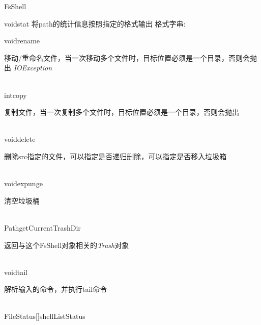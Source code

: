 \begin{XeClass}{FsShell}
\begin{XeMethod}{}{void}{stat}
 将path的统计信息按照指定的格式输出
 格式字串:

  \end{XeMethod}

  \begin{XeMethod}{}{void}{rename}
       
 移动/重命名文件，当一次移动多个文件时，目标位置必须是一个目录，否则会抛出
 \emph{IOException}

  \end{XeMethod}

  \begin{XeMethod}{\XePrivate\\ }{int}{copy}
       
 复制文件，当一次复制多个文件时，目标位置必须是一个目录，否则会抛出

  \end{XeMethod}

  \begin{XeMethod}{\XePrivate\\ }{void}{delete}
       
 删除src指定的文件，可以指定是否递归删除，可以指定是否移入垃圾箱

  \end{XeMethod}

  \begin{XeMethod}{\XePrivate\\ }{void}{expunge}
       
 清空垃圾桶

  \end{XeMethod}

  \begin{XeMethod}{\XePublic\\ }{Path}{getCurrentTrashDir}
       
 返回与这个FsShell对象相关的\emph{Trash}对象

  \end{XeMethod}

  \begin{XeMethod}{\XePrivate\\ }{void}{tail}
       
 解析输入的命令，并执行tail命令

  \end{XeMethod}

  \begin{XeMethod}{\XePrivate\\ }{FileStatus[]}{shellListStatus}
       

\end{XeMethod}
\end{XeClass}
